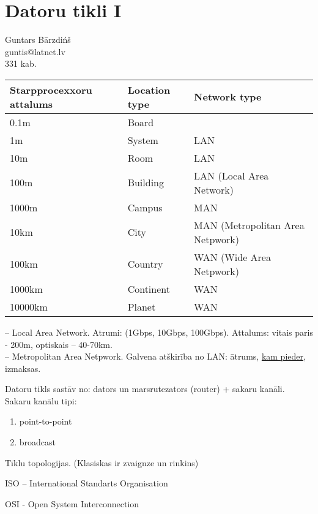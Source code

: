 \section{Datoru tikli I}
Guntars Bārzdińš \\
guntis@latnet.lv \\
331 kab.

\begin{center}
  \begin{tabular}{ l | l | l }
    Starpprocexxoru attalums & Location type  & Network type\\
  \hline
  0.1m   & Board \\
  1m     & System   & LAN\\
  10m    & Room     & LAN\\
  100m   & Building & LAN (Local Area Network)\\
  1000m  & Campus   & MAN\\
  10km   & City     & MAN (Metropolitan Area Netpwork)\\
  100km  & Country  & WAN (Wide Area Netpwork)\\
  1000km & Continent& WAN \\
  10000km& Planet   & WAN \\
  \end{tabular}
\end{center}

 -- Local Area Network.
Atrumi: (1Gbps, 10Gbps, 100Gbps).
Attalums: vitais paris - 200m, optiskais -- 40-70km.
\\

 -- Metropolitan Area Netpwork.
Galvena atškirība no LAN: ātrums, \underline{kam pieder}, izmaksas.


Datoru tikls sastāv no: dators un marsrutezators (router) + sakaru kanāli.
Sakaru kanālu tipi:
\begin{enumerate}
  \item point-to-point
  \item broadcast
\end{enumerate}

Tīklu topologijas. (Klasiskas ir zvaignze un rinkins)

ISO -- International Standarts Organisation

OSI - Open System Interconnection

